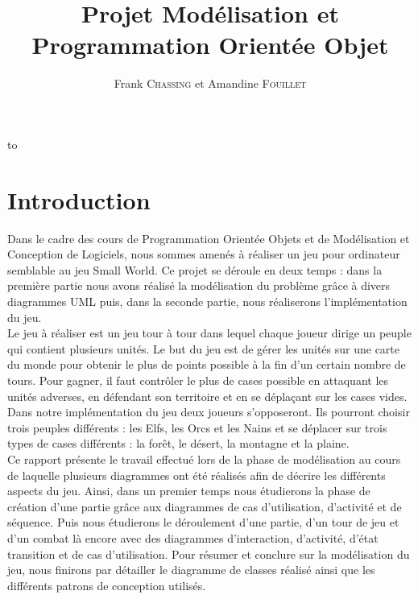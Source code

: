 \documentclass[a4paper,11pt]{article}
\author{}
\title{}
\title{\LARGE{Projet Modélisation et Programmation Orientée Objet}}
\author{Frank \textsc{Chassing} et Amandine \textsc{Fouillet}}
\makeatletter
\def\clap#1{\hbox to 0pt{\hss #1\hss}}%
\def\haut#1#2#3{%
\hbox to \hsize{%
\rlap{\vtop{\raggedright #1}}%
\hss
\clap{\vtop{\centering #2}}%
\hss
\llap{\vtop{\raggedleft #3}}}}%
\def\bas#1#2#3{%
\hbox to \hsize{%
\rlap{\vbox{\raggedright #1}}%
\hss
\clap{\vbox{\centering #2}}%
\hss
\llap{\vbox{\raggedleft #3}}}}%
\def\maketitle{%
\thispagestyle{empty}\vbox to \vsize{%
\haut{}{\@blurb}{}
\vfill
\vspace{1cm}
\begin{flushleft}
\usefont{OT1}{ptm}{m}{n}
\huge \@title
\end{flushleft}
\par
\hrule height 2pt
\par
\begin{flushright}
\usefont{OT1}{phv}{m}{n}
\Large \@author
\par
\end{flushright}
\vspace{1cm}
\vfill
\vfill
\bas{}{\@location, le \@date}{}
}%
\cleardoublepage
}
\makeatother
\begin{document}
\maketitle
\newpage
\tableofcontents
\newpage

\section*{Introduction}
	Dans le cadre des cours de Programmation Orientée Objets et de Modélisation et Conception de Logiciels, nous sommes amenés à réaliser un jeu pour ordinateur semblable au jeu Small World. Ce projet se déroule en deux temps : dans la première partie nous avons réalisé la modélisation du problème grâce à divers diagrammes UML puis, dans la seconde partie, nous réaliserons l'implémentation du jeu. \\

	Le jeu à réaliser est un jeu tour à tour dans lequel chaque joueur dirige un peuple qui contient plusieurs unités. Le but du jeu est de gérer les unités sur une carte du monde pour obtenir le plus de points possible à la fin d'un certain nombre de tours. Pour gagner, il faut contrôler le plus de cases possible en attaquant les unités adverses, en défendant son territoire et en se déplaçant sur les cases vides. Dans notre implémentation du jeu deux joueurs s'opposeront. Ils pourront choisir trois peuples différents : les Elfs, les Orcs et les Nains et se déplacer sur trois types de cases différents : la forêt, le désert, la montagne et la plaine.\\

	Ce rapport présente le travail effectué lors de la phase de modélisation au cours de laquelle plusieurs diagrammes ont été réalisés afin de décrire les différents aspects du jeu. Ainsi, dans un premier temps nous étudierons la phase de création d'une partie grâce aux diagrammes de cas d'utilisation, d'activité et de séquence. Puis nous étudierons le déroulement d'une partie, d'un tour de jeu et d'un combat là encore avec des diagrammes d'interaction, d'activité, d'état transition et de cas d'utilisation. Pour résumer et conclure sur la modélisation du jeu, nous finirons par détailler le diagramme de classes réalisé ainsi que les différents patrons de conception utilisés.
	\newpage
\end{document}
